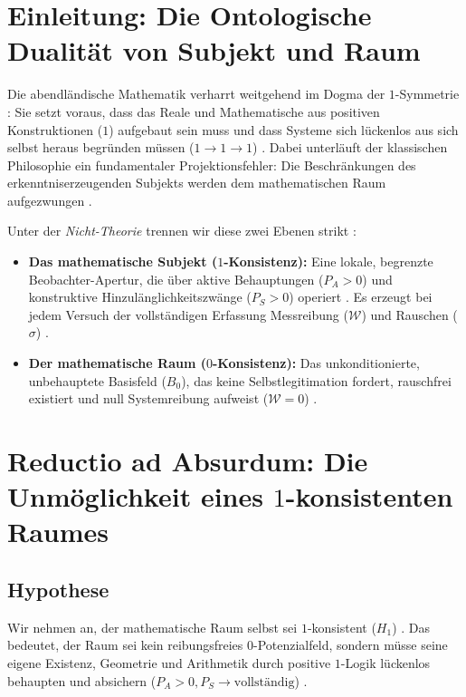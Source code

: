 \documentclass[11pt,a4paper]{article}
\begin{document}
\clearpage

\section{Einleitung: Die Ontologische Dualität von Subjekt und Raum}
Die abendländische Mathematik verharrt weitgehend im Dogma der $1$-Symmetrie \cite{nicht_theory_monograph, wittgenstein1922tractatus}: Sie setzt voraus, dass das Reale und Mathematische aus positiven Konstruktionen ($1$) aufgebaut sein muss und dass Systeme sich lückenlos aus sich selbst heraus begründen müssen ($1 \to 1 \to 1$) \cite{cook1971complexity, godel1931formal}. Dabei unterläuft der klassischen Philosophie ein fundamentaler Projektionsfehler: Die Beschränkungen des erkenntniserzeugenden Subjekts werden dem mathematischen Raum aufgezwungen \cite{nicht_physics_paper_1, nicht_theory_monograph}.

Unter der \textit{Nicht-Theorie} trennen wir diese zwei Ebenen strikt \cite{nicht_theory_monograph, nicht_physics_paper_4}:
\begin{itemize}
    \item \textbf{Das mathematische Subjekt ($1$-Konsistenz):} Eine lokale, begrenzte Beobachter-Apertur, die über aktive Behauptungen ($P_A > 0$) und konstruktive Hinzulänglichkeitszwänge ($P_S > 0$) operiert \cite{nicht_physics_paper_1}. Es erzeugt bei jedem Versuch der vollständigen Erfassung Messreibung ($\mathcal{W}$) und Rauschen ($\sigma$) \cite{nicht_physics_paper_3}.
    \item \textbf{Der mathematische Raum ($0$-Konsistenz):} Das unkonditionierte, unbehauptete Basisfeld ($B_0$), das keine Selbstlegitimation fordert, rauschfrei existiert und null Systemreibung aufweist ($\mathcal{W} = 0$) \cite{nicht_theory_monograph, dedekind1872stetigkeit}.
\end{itemize}

\section{Reductio ad Absurdum: Die Unmöglichkeit eines $1$-konsistenten Raumes}

\subsection{Hypothese}
Wir nehmen an, der mathematische Raum selbst sei $1$-konsistent ($H_1$) \cite{godel1931formal}. Das bedeutet, der Raum sei kein reibungsfreies $0$-Potenzialfeld, sondern müsse seine eigene Existenz, Geometrie und Arithmetik durch positive $1$-Logik lückenlos behaupten und absichern ($P_A > 0, P_S \to \text{vollständig}$) \cite{nicht_physics_paper_4, cook1971complexity}.
\end{document}

